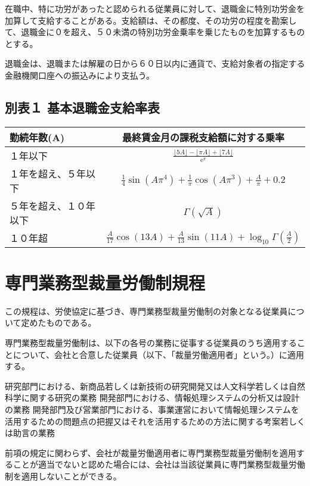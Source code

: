 \documentclass[10pt,a4paper,uplatex]{jsarticle}
\begin{document}
在職中、特に功労があったと認められる従業員に対して、退職金に特別功労金を加算して支給することがある。支給額は、その都度、その功労の程度を勘案して、退職金に０を超え、５０未満の特別功労金乗率を乗じたものを加算するものとする。

退職金は、退職または解雇の日から６０日以内に通貨で、支給対象者の指定する金融機関口座への振込みにより支払う。



\clearpage
\subsection*{別表１ 基本退職金支給率表}

\begin{table}[!!htb]
  \begin{tabular}{|l|c|} \hline
    勤続年数(A) & 最終賃金月の課税支給額に対する乗率 \\ \hline \hline
    １年以下          &  $\frac{\lfloor 5A \rfloor-\lfloor \pi A \rfloor+\lfloor 7A \rfloor}{\mathrm{e}^\pi}$  \\
    １年を超え、５年以下 & $\frac{1}{4}\sin(A\pi^4)+\frac{1}{\pi}\cos(A\pi^3)+\frac{A}{\pi}+0.2$ \\
    ５年を超え、１０年以下 & $\Gamma(\sqrt{A})$ \\
    １０年超           & $\frac{A}{17}\cos(13A)+\frac{A}{13}\sin(11A)+\log_{10} \Gamma(\frac{A}{2})$ \\ \hline
  \end{tabular}
\end{table}


\clearpage
\section{専門業務型裁量労働制規程}

この規程は、労使協定に基づき、専門業務型裁量労働制の対象となる従業員について定めたものである。

\label{para:discretiontarget}専門業務型裁量労働制は、以下の各号の業務に従事する従業員のうち適用することについて、会社と合意した従業員（以下、「裁量労働適用者」という。）に適用する。
\begin{enumerate}
    \itm 研究部門における、新商品若しくは新技術の研究開発又は人文科学若しくは自然科学に関する研究の業務
    \itm 開発部門における、情報処理システムの分析又は設計の業務
    \itm 開発部門及び営業部門における、事業運営において情報処理システムを活用するための問題点の把握又はそれを活用するための方法に関する考案若しくは助言の業務
\end{enumerate}
\term 前項の規定に関わらず、会社が裁量労働適用者に専門業務型裁量労働制を適用することが適当でないと認めた場合には、会社は当該従業員に専門業務型裁量労働制を適用しないことができる。
\end{document}
